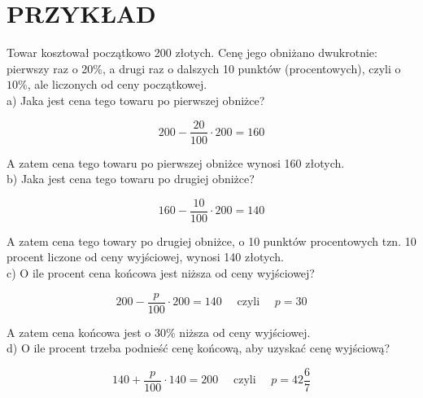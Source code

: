 \documentclass[10pt]{article}
\begin{document}
\section*{PRZYKŁAD}
Towar kosztował początkowo 200 złotych. Cenę jego obniżano dwukrotnie: pierwszy raz o 20\%, a drugi raz o dalszych 10 punktów (procentowych), czyli o \(10 \%\), ale liczonych od ceny początkowej.\\
a) Jaka jest cena tego towaru po pierwszej obniżce?

\[
200-\frac{20}{100} \cdot 200=160
\]

A zatem cena tego towaru po pierwszej obniżce wynosi 160 złotych.\\
b) Jaka jest cena tego towaru po drugiej obniżce?

\[
160-\frac{10}{100} \cdot 200=140
\]

A zatem cena tego towary po drugiej obniżce, o 10 punktów procentowych tzn. 10 procent liczone od ceny wyjściowej, wynosi 140 złotych.\\
c) O ile procent cena końcowa jest niższa od ceny wyjściowej?

\[
200-\frac{p}{100} \cdot 200=140 \quad \text { czyli } \quad p=30
\]

A zatem cena końcowa jest o \(30 \%\) niższa od ceny wyjściowej.\\
d) O ile procent trzeba podnieść cenę końcową, aby uzyskać cenę wyjściową?

\[
140+\frac{p}{100} \cdot 140=200 \quad \text { czyli } \quad p=42 \frac{6}{7}
\]
\end{document}
